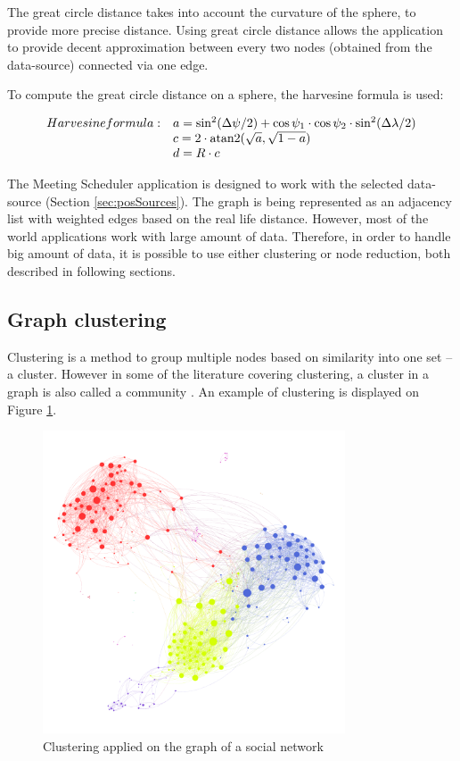 \documentclass[thesis=M,english]{FITthesis}[2012/10/20]
\DeclareMathOperator{\atantwo}{atan2}
\begin{document}
The great circle distance takes into account the curvature of the sphere, to provide more precise distance. Using great circle distance allows the application to provide decent approximation between every two nodes (obtained from the data-source) connected via one edge.

To compute the great circle distance on a sphere, the harvesine formula is used: 

$$
\begin{array}{l l}
Harvesine formula: & a = \sin^2(\Delta \psi /2) + \cos \psi_1 \cdot \cos \psi_2 \cdot \sin^2(\Delta \lambda /2) \\
& c = 2 \cdot \atantwo ( \sqrt{a}, \sqrt{1 - a} ) \\
& d = R \cdot c
\end{array}
$$ 

The Meeting Scheduler application is designed to work with the selected data-source (Section \ref{sec:posSources}). The graph is being represented as an adjacency list with weighted edges based on the real life distance. However, most of the world applications work with large amount of data. Therefore, in order to handle big amount of data, it is possible to use either clustering or node reduction, both described in following sections.

\subsection{Graph clustering}
\label{sec:Clustering}
Clustering is a method to group multiple nodes based on similarity into one set -- a cluster. However in some of the literature covering clustering, a cluster in a graph is also called a community \cite{Newman04}. An example of clustering is displayed on Figure \ref{pic:Clustering}.


\begin{figure}[h]
\centering
\includegraphics[width=0.8\textwidth]{pics/clustering}
\caption{Clustering applied on the graph of a social network \cite{Griffen17}}
\label{pic:Clustering}
\end{figure}
\end{document}
